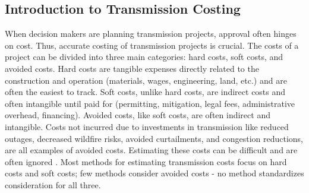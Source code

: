 \documentclass[11pt,twocolumn,a4paper]{article}
\begin{document}


\subsection{Introduction to Transmission Costing}
When decision makers are planning transmission projects, approval often hinges on cost. Thus, accurate costing of transmission projects is crucial. The costs of a project can be divided into three main categories: hard costs, soft costs, and avoided costs. Hard costs are tangible expenses directly related to the construction and operation (materials, wages, engineering, land, etc.) and are often the easiest to track. Soft costs, unlike hard costs, are indirect costs and often intangible until paid for (permitting, mitigation, legal fees, administrative overhead, financing). Avoided costs, like soft costs, are often indirect and intangible. Costs not incurred due to investments in transmission like reduced outages, decreased wildfire risks, avoided curtailments, and congestion reductions, are all examples of avoided costs. Estimating these costs can be difficult and are often ignored \parencite{EllramTate2021}. Most methods for estimating transmission costs focus on hard costs and soft costs; few methods consider avoided costs - no method standardizes consideration for all three.
\end{document}
